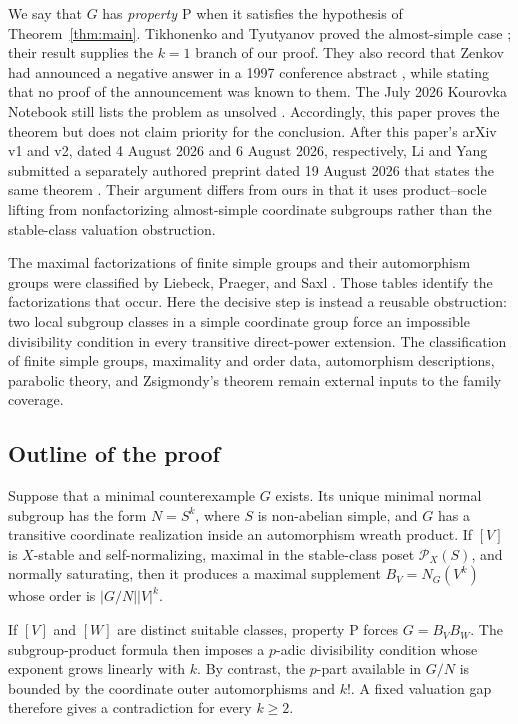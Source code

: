 \documentclass[11pt]{amsart}
\theoremstyle{definition}
\theoremstyle{remark}
\newcommand{\Pos}{\mathcal{P}}
\begin{document}
We say that $G$ has \emph{property $\mathrm{P}$} when it satisfies the
hypothesis of Theorem~\ref{thm:main}. Tikhonenko and Tyutyanov proved the
almost-simple case \cite{TT2010}; their result supplies the $k=1$ branch of
our proof. They also record that Zenkov had announced a negative answer in a
1997 conference abstract \cite{Zenkov1997}, while stating that no proof of the
announcement was known to them. The July 2026 Kourovka Notebook still lists
the problem as unsolved \cite{Kourovka}. Accordingly, this paper proves the
theorem but does not claim priority for the conclusion. After this paper's
arXiv v1 and v2, dated 4 August 2026 and 6 August 2026, respectively, Li and
Yang submitted a separately authored preprint dated 19 August 2026 that states
the same theorem \cite{LiYang2026}. Their argument differs from ours in that it
uses product--socle lifting from nonfactorizing almost-simple coordinate
subgroups rather than the stable-class valuation obstruction.

The maximal factorizations of finite simple groups and their automorphism
groups were classified by Liebeck, Praeger, and Saxl \cite{LPS1990}. Those
tables identify the factorizations that occur. Here the decisive step is
instead a reusable obstruction: two local subgroup classes in a simple
coordinate group force an impossible divisibility condition in every
transitive direct-power extension. The classification of finite simple groups,
maximality and order data, automorphism descriptions, parabolic theory, and
Zsigmondy's theorem remain external inputs to the family coverage.

\subsection*{Outline of the proof}
Suppose that a minimal counterexample $G$ exists. Its unique minimal normal
subgroup has the form $N=S^k$, where $S$ is non-abelian simple, and $G$ has a
transitive coordinate realization inside an automorphism wreath product. If
$[V]$ is $X$-stable and self-normalizing, maximal in the stable-class poset
$\Pos_X(S)$, and normally saturating, then it produces a maximal supplement
$B_V=N_G(V^k)$ whose order is $|G/N||V|^k$.

If $[V]$ and $[W]$ are distinct suitable classes, property $\mathrm{P}$ forces
$G=B_VB_W$. The subgroup-product formula then imposes a $p$-adic divisibility
condition whose exponent grows linearly with $k$. By contrast, the $p$-part
available in $G/N$ is bounded by the coordinate outer automorphisms and $k!$.
A fixed valuation gap therefore gives a contradiction for every $k\geq2$.
\end{document}
